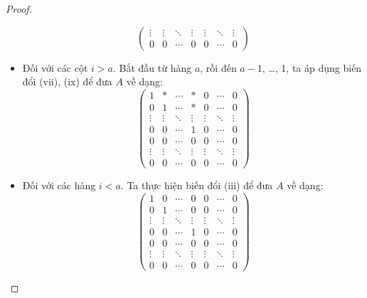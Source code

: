 \documentclass[class=linearalgebra,crop=false]{standalone}
\begin{document}
\begin{proof}
\begin{itemize}
\[\begin{pmatrix}
                      \vdots & \vdots & \ddots & \vdots & \vdots & \ddots & \vdots \\
                      0      & 0      & \cdots & 0      & 0      & \cdots & 0
                  \end{pmatrix}
              \]
        \item Đối với các cột $i > a$. Bắt đầu từ hàng $a$, rồi đến $a-1$, \ldots, 1, ta áp dụng biến đổi (vii), (ix) để đưa $A$ về dạng:
              \[
                  \begin{pmatrix}
                      1      & *      & \cdots & *      & 0      & \cdots & 0      \\
                      0      & 1      & \cdots & *      & 0      & \cdots & 0      \\
                      \vdots & \vdots & \ddots & \vdots & \vdots & \ddots & \vdots \\
                      0      & 0      & \cdots & 1      & 0      & \cdots & 0      \\
                      0      & 0      & \cdots & 0      & 0      & \cdots & 0      \\
                      \vdots & \vdots & \ddots & \vdots & \vdots & \ddots & \vdots \\
                      0      & 0      & \cdots & 0      & 0      & \cdots & 0
                  \end{pmatrix}
              \]
        \item Đối với các hàng $i < a$. Ta thực hiện biến đổi (iii) để đưa $A$ về dạng:
              \[
                  \begin{pmatrix}
                      1      & 0      & \cdots & 0      & 0      & \cdots & 0      \\
                      0      & 1      & \cdots & 0      & 0      & \cdots & 0      \\
                      \vdots & \vdots & \ddots & \vdots & \vdots & \ddots & \vdots \\
                      0      & 0      & \cdots & 1      & 0      & \cdots & 0      \\
                      0      & 0      & \cdots & 0      & 0      & \cdots & 0      \\
                      \vdots & \vdots & \ddots & \vdots & \vdots & \ddots & \vdots \\
                      0      & 0      & \cdots & 0      & 0      & \cdots & 0
                  \end{pmatrix}
\]
\end{itemize}
\end{proof}
\end{document}
